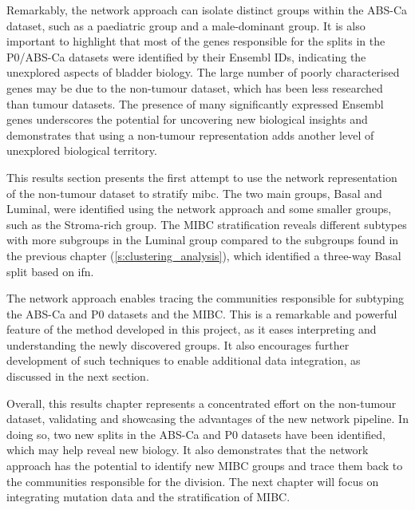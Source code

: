 Remarkably, the network approach can isolate distinct groups within the ABS-Ca dataset, such as a paediatric group and a male-dominant group. It is also important to highlight that most of the genes responsible for the splits in the P0/ABS-Ca datasets were identified by their Ensembl IDs, indicating the unexplored aspects of bladder biology. The large number of poorly characterised genes may be due to the non-tumour dataset, which has been less researched than tumour datasets. The presence of many significantly expressed Ensembl genes underscores the potential for uncovering new biological insights and demonstrates that using a non-tumour representation adds another level of unexplored biological territory.

This results section presents the first attempt to use the network representation of the non-tumour dataset to stratify \acrlong{mibc}. The two main groups, Basal and Luminal, were identified using the network approach and some smaller groups, such as the Stroma-rich group. The MIBC stratification reveals different subtypes with more subgroups in the Luminal group compared to the subgroups found in the previous chapter (\cref{s:clustering_analysis}), which identified a three-way Basal split based on \acrlong{ifn}.

The network approach enables tracing the communities responsible for subtyping the ABS-Ca and P0 datasets and the MIBC. This is a remarkable and powerful feature of the method developed in this project, as it eases interpreting and understanding the newly discovered groups. It also encourages further development of such techniques to enable additional data integration, as discussed in the next section.

Overall, this results chapter represents a concentrated effort on the non-tumour dataset, validating and showcasing the advantages of the new network pipeline. In doing so, two new splits in the ABS-Ca and P0 datasets have been identified, which may help reveal new biology. It also demonstrates that the network approach has the potential to identify new MIBC groups and trace them back to the communities responsible for the division. The next chapter will focus on integrating mutation data and the stratification of MIBC.




